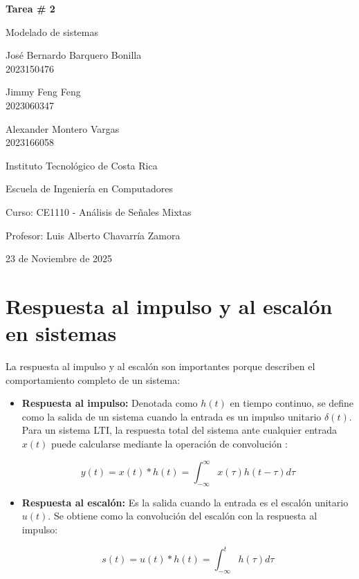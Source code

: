 \documentclass[letter,12pt]{article}
\begin{document}
\begin{titlepage}
    \centering
    {\LARGE \textbf{Tarea \# 2} \par}
    {\LARGE Modelado de sistemas \par}
    \vspace{1.5cm}
    {\large José Bernardo Barquero Bonilla \\ 2023150476 \par}
    {\large Jimmy Feng Feng \\ 2023060347 \par}
    {\large Alexander Montero Vargas \\ 2023166058 \par}
    \vspace{1.5cm}
    {\Large Instituto Tecnológico de Costa Rica \par}
    {\large Escuela de Ingeniería en Computadores \par}
    {\large Curso: CE1110 - Análisis de Señales Mixtas \par}
    \vspace{1.5cm}
    {\large Profesor: Luis Alberto Chavarría Zamora \par}
    \vfill
    {\large 23 de Noviembre de 2025 \par}
\end{titlepage}


\section{Respuesta al impulso y al escalón en sistemas}

\par La respuesta al impulso y al escalón son importantes porque describen el comportamiento completo de un sistema:

\begin{itemize}
	\item \textbf{Respuesta al impulso:} Denotada como $h(t)$ en tiempo continuo, se define como la salida de un sistema cuando la entrada es un impulso unitario $\delta(t)$. Para un sistema LTI, la respuesta total del sistema ante cualquier entrada $x(t)$ puede calcularse mediante la operación de convolución \cite{oppenheim1997signals}:
	
	\begin{equation}
		y(t) = x(t) * h(t) = \int_{-\infty}^{\infty} x(\tau)h(t-\tau) d\tau
	\end{equation}
	
	
	\item \textbf{Respuesta al escalón:} Es la salida cuando la entrada es el escalón unitario $u(t)$. Se obtiene como la convolución del escalón con la respuesta al impulso\cite{oppenheim1997signals}:
	
	\begin{equation}
		s(t) = u(t) * h(t) = \int_{-\infty}^{t}h(\tau)d\tau
	\end{equation}
	
\end{itemize}
\end{document}
